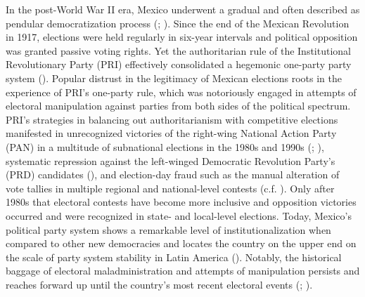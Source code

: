 \documentclass[11pt, ngerman,english,a4]{article}
\begin{document}
In the post-World War II era, Mexico underwent a gradual and often described as pendular democratization process (\citealt{Cantu2015}; \citealt{Hiskey2005}). Since the end of the Mexican Revolution in 1917, elections were held regularly in six-year intervals and political opposition was granted passive voting rights. Yet the authoritarian rule of the Institutional Revolutionary Party (PRI) effectively consolidated a hegemonic one-party party system (\citealt{Sartori1976}).
Popular distrust in the legitimacy of Mexican elections roots in the experience of PRI's one-party rule, which was notoriously engaged in attempts of electoral manipulation against parties from both sides of the political spectrum. 
PRI's strategies in balancing out authoritarianism with competitive elections manifested in unrecognized victories of the right-wing National Action Party (PAN) in a multitude of subnational elections in the 1980s and 1990s (\citealt{Greene2007}; \citealt{Cantu2015}), systematic repression against the left-winged Democratic Revolution Party's (PRD) candidates (\citealt{Greene2007}), and election-day fraud such as the manual alteration of vote tallies in multiple regional and national-level contests (c.f. \citealt{Cantu2019b}).
Only after 1980s that electoral contests have become more inclusive and opposition victories occurred and were recognized in state- and local-level elections.
Today, Mexico's political party system shows a remarkable level of institutionalization when compared to other new democracies and locates the country on the upper end on the scale of party system stability in Latin America (\citealt{Greene2018}). Notably, the historical baggage of electoral maladministration and attempts of manipulation persists and reaches forward up until the country's most recent electoral events (\citealt{Cantu2014}; \citealt{Cantu2019a}). 
\end{document}
